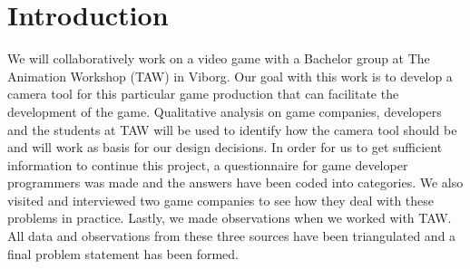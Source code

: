 \section{Introduction}
We will collaboratively work on a video game with a Bachelor group at The Animation Workshop (TAW) in Viborg. Our goal with this work is to develop a camera tool for this particular game production that can facilitate the development of the game. Qualitative analysis on game companies, developers and the students at TAW will be used to identify how the camera tool should be and will work as basis for our design decisions. In order for us to get sufficient information to continue this project, a questionnaire for game developer programmers was made and the answers have been coded into categories. We also visited and interviewed two game companies to see how they deal with these problems in practice. Lastly, we made observations when we worked with TAW. All data and observations from these three sources have been triangulated and a final problem statement has been formed.
